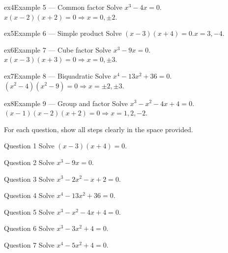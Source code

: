 \documentclass[11pt]{article}
\begin{document}
\begin{example}{ex4}{Example 5 --- Common factor}
Solve $x^3-4x=0$.\soln $x(x-2)(x+2)=0\Rightarrow x=0,\pm2$.
\end{example}

\begin{example}{ex5}{Example 6 --- Simple product}
Solve $(x-3)(x+4)=0$.\soln $x=3,-4$.
\end{example}

\begin{example}{ex6}{Example 7 --- Cube factor}
Solve $x^3-9x=0$.\soln $x(x-3)(x+3)=0\Rightarrow x=0,\pm3$.
\end{example}

\begin{example}{ex7}{Example 8 --- Biquadratic}
Solve $x^4-13x^2+36=0$.\soln $(x^2-4)(x^2-9)=0\Rightarrow x=\pm2,\pm3$.
\end{example}

\begin{example}{ex8}{Example 9 --- Group and factor}
Solve $x^3-x^2-4x+4=0$.\soln $(x-1)(x-2)(x+2)=0\Rightarrow x=1,2,-2$.
\end{example}

\clearpage
{}
For each question, show all steps clearly in the space provided.

\begin{qbox}{Question 1}
Solve $(x-3)(x+4)=0$.\workspace{2.4cm}
\end{qbox}

\begin{qbox}{Question 2}
Solve $x^3-9x=0$.\workspace{2.4cm}
\end{qbox}

\begin{qbox}{Question 3}
Solve $x^3-2x^2-x+2=0$.\workspace{2.4cm}
\end{qbox}

\begin{qbox}{Question 4}
Solve $x^4-13x^2+36=0$.\workspace{2.4cm}
\end{qbox}

\begin{qbox}{Question 5}
Solve $x^3-x^2-4x+4=0$.\workspace{2.4cm}
\end{qbox}

\begin{qbox}{Question 6}
Solve $x^3-3x^2+4=0$.\workspace{2.4cm}
\end{qbox}

\begin{qbox}{Question 7}
Solve $x^4-5x^2+4=0$.\workspace{2.4cm}
\end{qbox}
\end{document}
